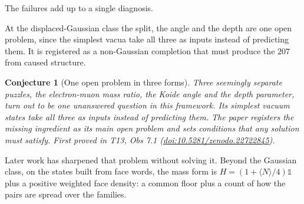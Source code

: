 \documentclass[11pt]{article}
\newtheorem{conjecture}[theorem]{Conjecture}
\theoremstyle{definition}
\theoremstyle{plain}
\begin{document}
The failures add up to a single diagnosis.

At the displaced-Gaussian class the split, the angle and the depth are one open problem, since the simplest vacua take all three as inputs instead of predicting them. It is registered as a non-Gaussian completion that must produce the $207$ from caused structure.

\begin{conjecture}[One open problem in three forms]\label{c:families.one-open-problem-three-forms}
Three seemingly separate puzzles, the electron-muon mass ratio, the Koide angle and the depth parameter, turn out to be one unanswered question in this framework. Its simplest vacuum states take all three as inputs instead of predicting them. The paper registers the missing ingredient as its main open problem and sets conditions that any solution must satisfy.
\emph{First proved in} T13, Obs 7.1 (\href{https://doi.org/10.5281/zenodo.22722845}{doi:10.5281/zenodo.22722845}).
\end{conjecture}

Later work has sharpened that problem without solving it. Beyond the Gaussian class, on the states built from face words, the mass form is $H = (1 + \langle N\rangle/4)\mathbb{1}$ plus a positive weighted face density: a common floor plus a count of how the pairs are spread over the families.
\end{document}
